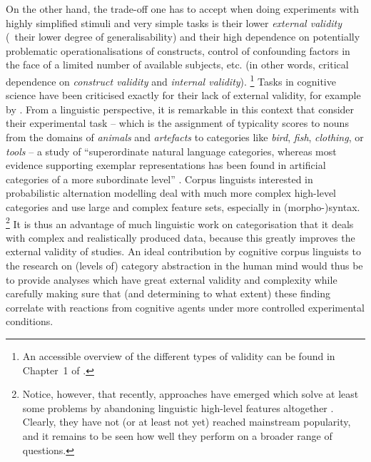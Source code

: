 On the other hand, the trade-off one has to accept when doing experiments with highly simplified stimuli and very simple tasks is their lower \textit{external validity} (\ie\ their lower degree of generalisability) and their high dependence on potentially problematic operationalisations of constructs, control of confounding factors in the face of a limited number of available subjects, etc. (in other words, critical dependence on \textit{construct validity} and \textit{internal validity}).%
\footnote{An accessible overview of the different types of validity can be found in Chapter~1 of \citet{MaxwellDelaney2004}.}
Tasks in cognitive science have been criticised exactly for their lack of external validity, for example by \citet{Murphy2003}.
From a linguistic perspective, it is remarkable in this context that \cite{VoorspoelsEa2011} consider their experimental task -- which is the assignment of typicality scores to nouns from the domains of \textit{animals} and \textit{artefacts} to categories like \textit{bird}, \textit{fish}, \textit{clothing}, or \textit{tools} -- a study of ``superordinate natural language categories, whereas most evidence supporting exemplar representations has been found in artificial categories of a more subordinate level'' \citep[1013]{VoorspoelsEa2011}.
Corpus linguists interested in probabilistic alternation modelling deal with much more complex high-level categories and use large and complex feature sets, especially in (morpho-)syntax.%
\footnote{Notice, however, that recently, approaches have emerged which solve at least some problems by abandoning linguistic high-level features altogether \citep{BaayenEa2016,RamscarPort2016}.
Clearly, they have not (or at least not yet) reached mainstream popularity, and it remains to be seen how well they perform on a broader range of questions.}
It is thus an advantage of much linguistic work on categorisation that it deals with complex and realistically produced data, because this greatly improves the external validity of studies.
An ideal contribution by cognitive corpus linguists to the research on (levels of) category abstraction in the human mind would thus be to provide analyses which have great external validity and complexity while carefully making sure that (and determining to what extent) these finding correlate with reactions from cognitive agents under more controlled experimental conditions.

